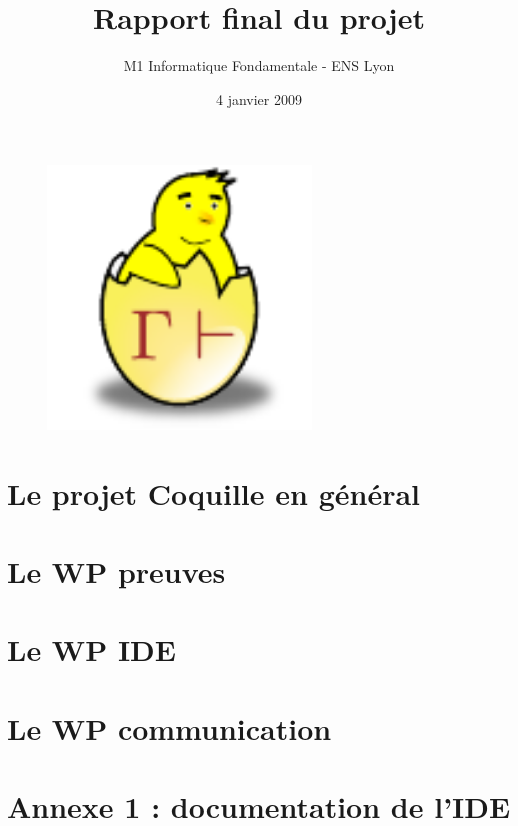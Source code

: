 \documentclass[a4paper,10pt]{report}
\date{4 janvier 2009}
\title{Rapport final du projet \coquille{}}
\author{M1 Informatique Fondamentale - ENS Lyon}
\begin{document}
\begin{figure}
\begin{center}
 \includegraphics[width=7cm]{poussin.pdf}
\end{center}
\end{figure}

\maketitle

\newpage

\tableofcontents

\newpage

\chapter{Le projet Coquille en g\'en\'eral}



\newpage

\chapter{Le WP preuves}



\newpage

\chapter{Le WP IDE}


% 

\newpage

\chapter{Le WP communication}



\newpage




\newpage

\chapter{Annexe 1 : documentation de l'IDE}

%
\end{document}
